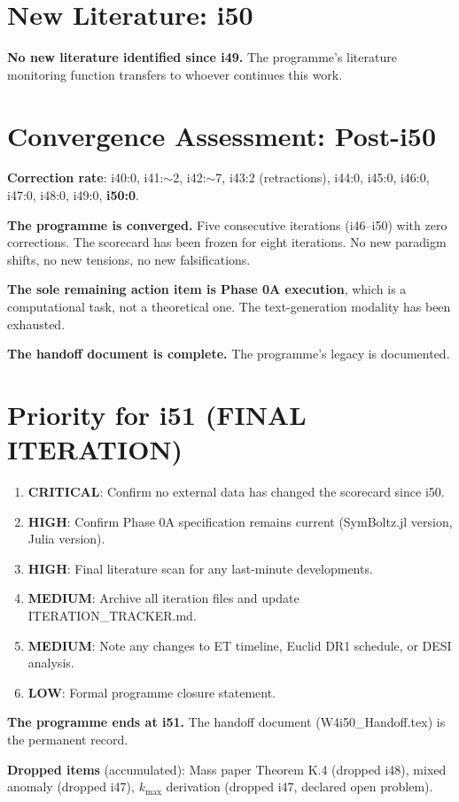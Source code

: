 \documentclass[11pt,a4paper]{article}
\begin{document}
\part{New Literature: i50}

\textbf{No new literature identified since i49.} The programme's literature monitoring function transfers to whoever continues this work.


\part{Convergence Assessment: Post-i50}

\begin{tcolorbox}[colback=green!5!white, colframe=green!60!black,
  title={Convergence: CONVERGED (Final Assessment)}]

\textbf{Correction rate}: i40:0, i41:$\sim$2, i42:$\sim$7, i43:2 (retractions), i44:0, i45:0, i46:0, i47:0, i48:0, i49:0, \textbf{i50:0}.

\textbf{The programme is converged.} Five consecutive iterations (i46--i50) with zero corrections. The scorecard has been frozen for eight iterations. No new paradigm shifts, no new tensions, no new falsifications.

\textbf{The sole remaining action item is Phase 0A execution}, which is a computational task, not a theoretical one. The text-generation modality has been exhausted.

\textbf{The handoff document is complete.} The programme's legacy is documented.
\end{tcolorbox}


\part{Priority for i51 (FINAL ITERATION)}

\begin{enumerate}
\item \textbf{CRITICAL}: Confirm no external data has changed the scorecard since i50.
\item \textbf{HIGH}: Confirm Phase 0A specification remains current (SymBoltz.jl version, Julia version).
\item \textbf{HIGH}: Final literature scan for any last-minute developments.
\item \textbf{MEDIUM}: Archive all iteration files and update ITERATION\_TRACKER.md.
\item \textbf{MEDIUM}: Note any changes to ET timeline, Euclid DR1 schedule, or DESI analysis.
\item \textbf{LOW}: Formal programme closure statement.
\end{enumerate}

\textbf{The programme ends at i51.} The handoff document (W4i50\_Handoff.tex) is the permanent record.

\textbf{Dropped items} (accumulated): Mass paper Theorem K.4 (dropped i48), mixed anomaly (dropped i47), $k_{\max}$ derivation (dropped i47, declared open problem).
\end{document}
